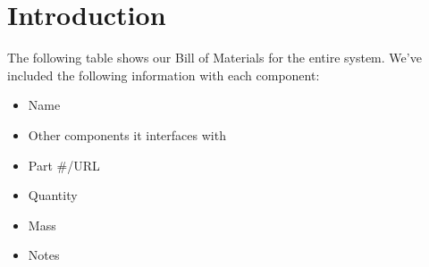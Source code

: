 \documentclass[]{auvsi_doc}
\begin{document}
\begin{AUVSITitlePage}
\begin{artifacttable}
\end{artifacttable}
\end{AUVSITitlePage}

\section{Introduction}
The following table shows our Bill of Materials for the entire system. We've included the following information with each component:

\begin{itemize}
	\item Name
	\item Other components it interfaces with
	\item Part \#/URL
	\item Quantity
	\item Mass
	\item Notes
\end{itemize}

\end{document}
